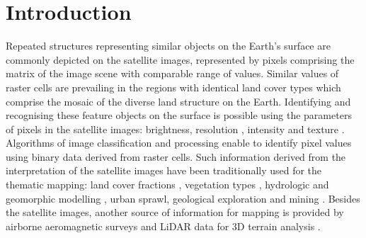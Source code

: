 \documentclass[ijgi,article,submit,pdftex,moreauthors]{Definitions/mdpi}
\begin{document}
\section{Introduction}
Repeated structures representing similar objects on the Earth's surface are commonly depicted on the satellite images, represented by pixels comprising the matrix of the image scene with comparable range of values. Similar values of raster cells are prevailing in the regions with identical land cover types which comprise the mosaic of the diverse land structure on the Earth. Identifying and recognising these feature objects on the surface is possible using the parameters of pixels in the satellite images: brightness, resolution \cite{4426419,322052,5446016}, intensity \cite{4761020,8519176} and texture \cite{995559,899813,8868688}. Algorithms of image classification and processing enable to identify pixel values using binary data derived from raster cells. Such information derived from the interpretation of the satellite images have been traditionally used for the thematic mapping: land cover fractions \cite{COULIBALY2021108092}, vegetation types \cite{7729337,Lemenkova2020d,6946534,Lemenkova202019,6352694}, hydrologic and geomorphic modelling \cite{2015hydrologie}, urban sprawl, geological exploration and mining \cite{1457509,NGOM2022102873}. Besides the satellite images, another source of information for mapping is provided by airborne aeromagnetic surveys \cite{JESSELL2015440,SIAGNE2022104680} and LiDAR data for 3D terrain analysis \cite{SHARMA2021317,8978301,9213897,YEH2017236,9553919,LI201955,GUPTA2022100817}. 
\end{document}

